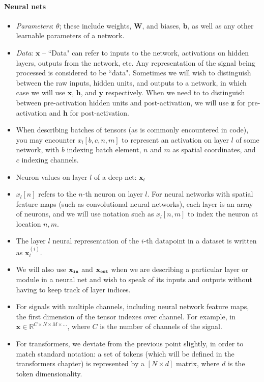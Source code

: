 \documentclass[12pt,letterpaper]{article}
\begin{document}
\paragraph{Neural nets}
\begin{itemize}
\item \textit{Parameters}: $\theta$; these include weights, $\mathbf{W}$, and biases, $\mathbf{b}$, as well as any other learnable parameters of a network.
\item \textit{Data}: $\mathbf{x}$ -- ``Data" can refer to inputs to the network, activations on hidden layers, outputs from the network, etc. Any representation of the signal being processed is considered to be ``data". Sometimes we will wish to distinguish between the raw inputs, hidden units, and outputs to a network, in which case we will use $\mathbf{x}$, $\mathbf{h}$, and $\mathbf{y}$ respectively. When we need to to distinguish between pre-activation hidden units and post-activation, we will use $\mathbf{z}$ for pre-activation and $\mathbf{h}$ for post-activation.

\item When describing batches of tensors (as is commonly encountered in code), you may encounter $x_l[b,c,n,m]$ to represent an activation on layer $l$ of some network, with $b$ indexing batch element, $n$ and $m$ as spatial coordinates, and $c$ indexing channels.
\item Neuron values on layer $l$ of a deep net: $\mathbf{x}_{l}$
\item $x_{l}[n]$ refers to the $n$-th neuron on layer $l$. For neural networks with spatial feature maps (such as convolutional neural networks), each layer is an array of neurons, and we will use notation such as $x_{l}[n,m]$ to index the neuron at location $n,m$.
\item The layer $l$ neural representation of the $i$-th datapoint in a dataset is written as $\mathbf{x}^{(i)}_{l}$.
\item We will also use $\mathbf{x}_{\texttt{in}}$ and $\mathbf{x}_{\texttt{out}}$ when we are describing a particular layer or module in a neural net and wish to speak of its inputs and outputs without having to keep track of layer indices.
\item For signals with multiple channels, including neural network feature maps, the first dimension of the tensor indexes over channel. For example, in $\mathbf{x} \in \mathbb{R}^{C \times N \times M \times \ldots}$, where $C$ is the number of channels of the signal.
\item For transformers, we deviate from the previous point slightly, in order to match standard notation: a set of tokens (which will be defined in the transformers chapter) is represented by a $[N \times d]$ matrix, where $d$ is the token dimensionality.
\end{itemize}
\end{document}
